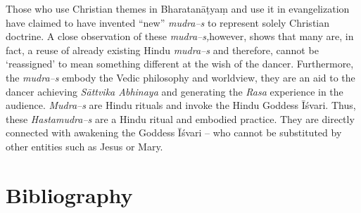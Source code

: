 Those who use Christian themes in Bharatanāṭyaṃ and use it in evangelization have claimed to have invented “new” \textit{mudra–s} to represent solely Christian doctrine. A close observation of these \textit{mudra–s,}however, shows that many are, in fact, a reuse of already existing Hindu \textit{mudra–s }and therefore, cannot be ‘reassigned’ to mean something different at the wish of the dancer. Furthermore, the \textit{mudra–s }embody the Vedic philosophy and worldview, they are an aid to the dancer achieving \textit{Sāttvika Abhinaya} and generating the \textit{Rasa} experience in the audience. \textit{Mudra–s }are Hindu rituals and invoke the Hindu Goddess Īśvari. Thus, these \textit{Hastamudra–s} are a Hindu ritual and embodied practice. They are directly connected with awakening the Goddess Īśvari – who cannot be substituted by other entities such as Jesus or Mary.


\section*{Bibliography}

